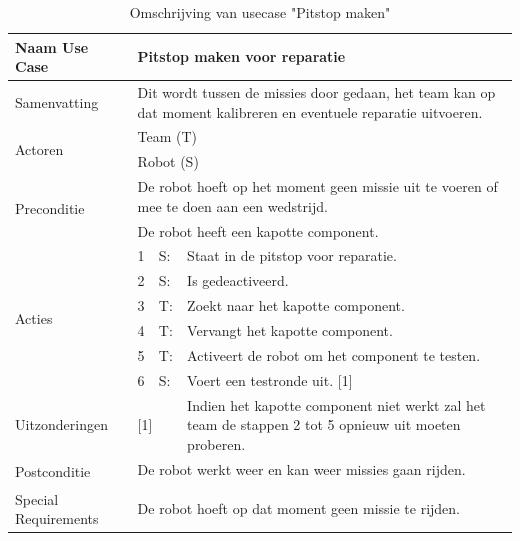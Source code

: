 \documentclass[12pt]{article} %
\begin{document}
\begin{landscape}
\begin{table}[htbp]
  \centering
    \begin{tabular}{llll}
    \toprule
    Naam Use Case & \multicolumn{3}{l}{\textbf{Pitstop maken voor reparatie}} \\
    \midrule
    Samenvatting & \multicolumn{3}{l}{Dit wordt tussen de missies door gedaan, het team kan op dat moment kalibreren en eventuele reparatie uitvoeren.} \\
    \multirow{2}[1]{*}{Actoren} & \multicolumn{3}{l}{Team (T)} \\
          & \multicolumn{3}{l}{Robot (S)} \\
    \multirow{2}[1]{*}{Preconditie} & \multicolumn{3}{l}{De robot hoeft op het moment geen missie uit te voeren of mee te doen aan een wedstrijd.} \\
          & \multicolumn{3}{l}{De robot heeft een kapotte component.} \\
    \multirow{6}[11]{*}{Acties} & 1     & S:    & Staat in de pitstop voor reparatie. \\
          & 2     & S:    & Is gedeactiveerd. \\
          & 3     & T:    & Zoekt naar het kapotte component. \\
          & 4     & T:    & Vervangt het kapotte component. \\
          & 5     & T:    & Activeert de robot om het component te testen. \\
          & 6     & S:    & Voert een testronde uit. [1] \\
    Uitzonderingen & \multicolumn{2}{l}{[1]} & Indien het kapotte component niet werkt zal het team de stappen 2 tot 5 opnieuw uit moeten proberen. \\
    \multirow{2}[1]{*}{Postconditie} & \multicolumn{3}{l}{De robot werkt weer en kan weer missies gaan rijden.} \\
          & \multicolumn{3}{l}{} \\
    Special Requirements  & \multicolumn{3}{l}{De robot hoeft op dat moment geen missie te rijden.} \\
    \bottomrule
    \end{tabular}%
  \caption{Omschrijving van usecase "Pitstop maken"}
  \label{tab:addlabel3}%
\end{table}%
\clearpage
\end{landscape}
\end{document}
